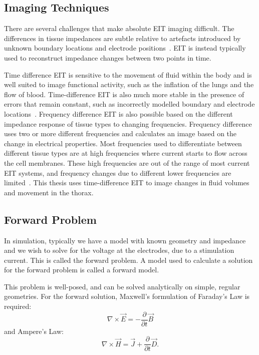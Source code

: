 \subsection{Imaging Techniques}
There are several challenges that make absolute EIT imaging difficult. 
The differences in tissue impedances are subtle relative to artefacts introduced 
by unknown boundary locations and electrode 
positions~\parencite{adler_why_2015,adler_electrical_2017,nissinen_compensation_2009}. 
EIT is instead typically used to reconstruct impedance changes between two points in time.

Time difference EIT is sensitive to the movement of fluid within the body 
and is well suited to image functional activity, such as 
the inflation of the lungs 
and the flow of blood.
Time-difference EIT is also much more stable in the presence of errors that remain 
constant, such as incorrectly modelled boundary and electrode 
locations~\parencite{brown_electrical_2003}.
Frequency difference EIT is also possible based on the different impedance response 
of tissue types to changing frequencies. Frequency difference uses 
two or more different frequencies and calculates an image based on the change in electrical properties.
Most frequencies used to differentiate between different tissue types are at high frequencies 
where current starts to flow across the cell membranes. 
These high frequencies are out of the range of most current EIT systems, and 
frequency changes due to different lower frequencies are limited~\parencite{adler_electrical_2017}.
This thesis uses time-difference EIT to image changes in fluid volumes and movement in the thorax.

\subsection{Forward Problem} \label{sec:fwd}
In simulation, typically we have a model with known geometry and impedance and we wish to solve for the 
voltage at the electrodes, due to a stimulation current. 
This is called the forward problem. 
A model used to calculate a solution for the forward problem is called a forward 
model. 

This problem is well-posed, and can be solved analytically on simple, regular geometries. 
For the forward solution, Maxwell's formulation of Faraday's Law is required:
\begin{equation} \label{eq:farad}
\nabla \times \vec{E} = -\frac{\partial}{\partial t} \vec{B}
\end{equation}
and Ampere's Law: 
\begin{equation} \label{eq:amp}
\nabla \times \vec{H} = \vec{J} + \frac{\partial}{\partial t} \vec{D}.
\end{equation}

